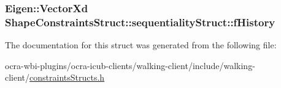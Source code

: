 \hypertarget{structShapeConstraintsStruct_1_1sequentialityStruct_aa5a0454f0be11f06111cce4ab94db891}{
\subsubsection[{f\-History}]{\setlength{\rightskip}{0pt plus 5cm}\-Eigen\-::\-Vector\-Xd {\bf \-Shape\-Constraints\-Struct\-::sequentiality\-Struct\-::f\-History}}}\label{structShapeConstraintsStruct_1_1sequentialityStruct_aa5a0454f0be11f06111cce4ab94db891}


\-The documentation for this struct was generated from the following file\-:\begin{DoxyCompactItemize}
\item 
ocra-\/wbi-\/plugins/ocra-\/icub-\/clients/walking-\/client/include/walking-\/client/\hyperlink{constraintsStructs_8h}{constraints\-Structs.\-h}\end{DoxyCompactItemize}
